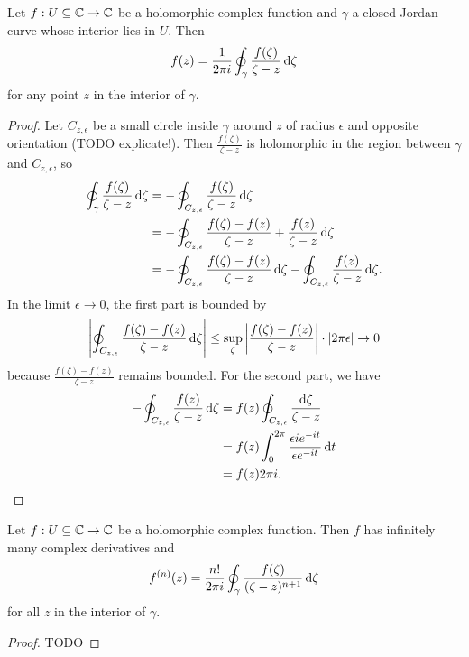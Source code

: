 \begin{theorem} \label{CauchyIntergralFormula}
Let $f: U\subseteq \mathbb{C} \to \mathbb{C}$ be a holomorphic complex function and $\gamma$ a closed Jordan curve whose interior lies in $U$. Then
\[ f(z) = \frac{1}{2\pi i}\oint_\gamma \frac{f(\zeta)}{\zeta - z}\operatorname{d \!}{\zeta} \]
for any point $z$ in the interior of $\gamma$.
\end{theorem}
\begin{proof}
Let $C_{z,\epsilon}$ be a small circle inside $\gamma$ around $z$ of radius $\epsilon$ and opposite orientation (TODO explicate!). Then $\frac{f(\zeta)}{\zeta - z}$ is holomorphic in the region between $\gamma$ and $C_{z,\epsilon}$, so
\begin{align*}
\oint_\gamma \frac{f(\zeta)}{\zeta - z}\operatorname{d \!}{\zeta} &= -\oint_{C_{z,\epsilon}} \frac{f(\zeta)}{\zeta - z}\operatorname{d \!}{\zeta} \\
&= -\oint_{C_{z,\epsilon}} \frac{f(\zeta)-f(z)}{\zeta - z} + \frac{f(z)}{\zeta - z}\operatorname{d \!}{\zeta} \\
&= -\oint_{C_{z,\epsilon}} \frac{f(\zeta)-f(z)}{\zeta - z}\operatorname{d \!}{\zeta} -\oint_{C_{z,\epsilon}}\frac{f(z)}{\zeta - z}\operatorname{d \!}{\zeta}.
\end{align*}
In the limit $\epsilon \to 0$, the first part is bounded by
\[ \left|\oint_{C_{z,\epsilon}} \frac{f(\zeta)-f(z)}{\zeta - z}\operatorname{d \!}{\zeta}\right| \leq \sup_\zeta\left|\frac{f(\zeta)-f(z)}{\zeta - z}\right| \cdot |2\pi\epsilon| \to 0 \]
because $\frac{f(\zeta)-f(z)}{\zeta - z}$ remains bounded. For the second part, we have
\begin{align*}
-\oint_{C_{z,\epsilon}} \frac{f(z)}{\zeta - z}\operatorname{d \!}{\zeta} &= f(z)\oint_{C_{z,\epsilon}} \frac{\operatorname{d \!}{\zeta}}{\zeta - z} \\
&= f(z)\int_0^{2\pi}\frac{\epsilon ie^{-it}}{\epsilon e^{-it}}\operatorname{d \!}{t} \\
&= f(z)2\pi i.
\end{align*}
\end{proof}
\begin{corollary}
Let $f: U\subseteq \mathbb{C} \to \mathbb{C}$ be a holomorphic complex function. Then $f$ has infinitely many complex derivatives and
\[ f^{(n)}(z) = \frac{n!}{2\pi i}\oint_\gamma \frac{f(\zeta)}{(\zeta-z)^{n+1}}\operatorname{d \!}{\zeta} \]
for all $z$ in the interior of $\gamma$.
\end{corollary}
\begin{proof}
TODO
\end{proof}

